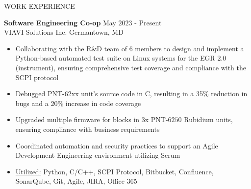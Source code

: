 \documentclass{resume} %
\begin{document}
\begin{rSection}{WORK EXPERIENCE}

\textbf{Software Engineering Co-op} \hfill May $2023$ - Present\\
VIAVI Solutions Inc. \hfill Germantown, MD
 \begin{itemize}[itemsep = -4pt]
     \item Collaborating with the R\&D team of $6$ members to design and implement a Python-based automated test suite on Linux systems for the EGR $2.0$ (instrument), ensuring comprehensive test coverage and compliance with the SCPI protocol
     \item Debugged PNT-$62$xx unit's source code in C, resulting in a 35\% reduction in bugs and a 20\% increase in code coverage
     \item Upgraded multiple firmware for blocks in $3$x PNT-$6250$ Rubidium units, ensuring compliance with business requirements
     \item Coordinated automation and security practices to support an Agile Development Engineering environment utilizing Scrum
     \item \underline{Utilized:} Python, C/C++, SCPI Protocol, Bitbucket, Confluence, SonarQube, Git, Agile, JIRA, Office 365
    \end{itemize}


\end{rSection}
\end{document}
